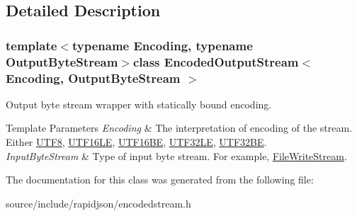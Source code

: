 \subsection{Detailed Description}
\subsubsection*{template$<$typename Encoding, typename Output\+Byte\+Stream$>$class Encoded\+Output\+Stream$<$ Encoding, Output\+Byte\+Stream $>$}

Output byte stream wrapper with statically bound encoding. 


\begin{DoxyTemplParams}{Template Parameters}
{\em Encoding} & The interpretation of encoding of the stream. Either \hyperlink{struct_u_t_f8}{U\+T\+F8}, \hyperlink{struct_u_t_f16_l_e}{U\+T\+F16\+L\+E}, \hyperlink{struct_u_t_f16_b_e}{U\+T\+F16\+B\+E}, \hyperlink{struct_u_t_f32_l_e}{U\+T\+F32\+L\+E}, \hyperlink{struct_u_t_f32_b_e}{U\+T\+F32\+B\+E}. \\
\hline
{\em Input\+Byte\+Stream} & Type of input byte stream. For example, \hyperlink{class_file_write_stream}{File\+Write\+Stream}. \\
\hline
\end{DoxyTemplParams}


The documentation for this class was generated from the following file\+:\begin{DoxyCompactItemize}
\item 
source/include/rapidjson/encodedstream.\+h\end{DoxyCompactItemize}
